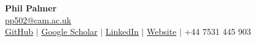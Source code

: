 \documentclass[letterpaper,11pt]{article}
\begin{document}

\begin{center}
    {\Huge\bfseries Phil Palmer} \\ \vspace{3pt}
    \href{mailto:pp502@cam.ac.uk}{\color{teal}pp502@cam.ac.uk} \\
    \href{https://github.com/PhilPalmer}{\color{teal}GitHub} $|$ \href{https://scholar.google.com/citations?user=VMrmNJcAAAAJ}{\color{teal}Google Scholar} $|$ \href{https://uk.linkedin.com/in/phil-palmer}{\color{teal}LinkedIn} $|$ \href{https://philpalmer.github.io/blog/}{\color{teal}Website} $|$  +44 7531 445 903 \\
\end{center}



\end{document}
